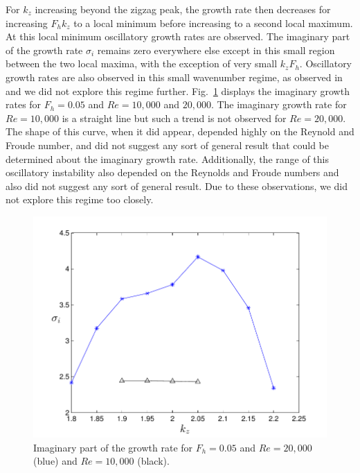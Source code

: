 For $k_{z}$ increasing beyond the zigzag peak, the growth rate then decreases for increasing $F_{h}k_{z}$ to a local minimum before increasing to a second local maximum. At this local minimum oscillatory growth rates are observed. The imaginary part of the growth rate $\sigma_{i}$ remains zero everywhere else except in this small region between the two local maxima, with the exception of very small $k_{z}F_{h}$. Oscillatory growth rates are also observed in this small wavenumber regime, as observed in \cite{bc1999} and we did not explore this regime further. Fig.~\ref{oscillatory_growth} displays the imaginary growth rates for $F_{h}=0.05$ and $Re=10{,}000$ and $20{,}000$. The imaginary growth rate for $Re=10{,}000$ is a straight line but such a trend is not observed for $Re=20{,}000$. The shape of this curve, when it did appear, depended highly on the Reynold and Froude number, and did not suggest any sort of general result that could be determined about the imaginary growth rate. Additionally, the range of this oscillatory instability also depended on the Reynolds and Froude numbers and also did not suggest any sort of general result. Due to these observations, we did not explore this regime too closely. 
\begin{figure}
\begin{center}
\includegraphics[scale=0.65]{oscillatory_growth}
\caption{Imaginary part of the growth rate for $F_{h}=0.05$ and $Re=20{,}000$ (blue) and $Re=10{,}000$ (black).}
\label{oscillatory_growth}
\end{center}
\end{figure} 

